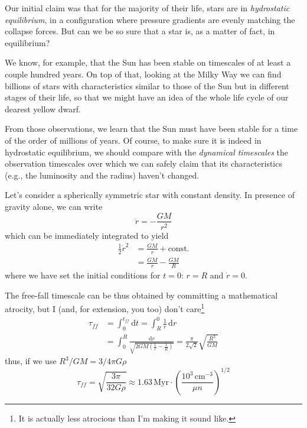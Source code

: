 \par Our initial claim was that for the majority of their life, stars are in \emph{hydrostatic equilibrium}, in a configuration where pressure gradients are evenly matching the collapse forces. But can we be so sure that a star is, as a matter of fact, in equilibrium?
\par We know, for example, that the Sun has been stable on timescales of at least a couple hundred years. On top of that, looking at the Milky Way we can find billions of stars with characteristics similar to those of the Sun but in different stages of their life, so that we might have an idea of the whole life cycle of our dearest yellow dwarf.
\par From those observations, we learn that the Sun must have been stable for a time of the order of millions of years. Of course, to make sure it is indeed in hydrostatic equilibrium, we should compare with the \emph{dynamical timescales} the observation timescales over which we can safely claim that its characteristics (e.g., the luminosity and the radius) haven't changed.
\par Let's consider a spherically symmetric star with constant density. In presence of gravity alone, we can write 
\begin{equation*}
	\ddot{r} = -\frac{GM}{r^{2}}
\end{equation*}
which can be immediately integrated to yield 
\begin{align*}
    \frac{1}{2}\dot{r}^{2} &= \frac{GM}{r}+\text{const.}\\
    &= \frac{GM}{r}-\frac{GM}{R}
\end{align*}
where we have set the initial conditions for $t=0$: $r=R$ and $\dot{r} = 0$.
\par The free-fall timescale can be thus obtained by committing a mathematical atrocity, but I (and, for extension, you too) don't care\footnote{It is actually less atrocious than I'm making it sound like.}
\begin{align*}
    \tau_{ff} &= \int_{0}^{t_{ff}} \text{d}t = \int_{R}^{0}\frac{1}{\dot{r}}\,\text{d}r \\
    &= \int_{0}^{R} \frac{\text{d}r}{\sqrt{2GM\left(\frac{1}{r}-\frac{1}{R}\right)}} = \frac{\pi}{2\sqrt{2}}\sqrt{\frac{R^{3}}{GM}}
\end{align*}
thus, if we use $R^{3}/GM = 3/4\pi G\rho$
\begin{equation}
    \tau_{ff} = \sqrt{\frac{3\pi}{32G\rho}} \approx 1.63\,\text{Myr}\cdot\left(\frac{10^{3}\,\text{cm}^{-3}}{\mu n}\right)^{1/2}
    \label{eq:ff_timescale}
\end{equation}

